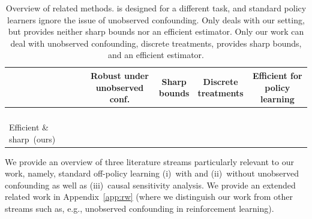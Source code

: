 \documentclass{article} %
\theoremstyle{plain}
\theoremstyle{definition}
\theoremstyle{remark}
\newcommand{\cmark}{\textcolor{ForestGreen}{\ding{51}}}
\newcommand{\xmark}{\textcolor{BrickRed}{\ding{55}}}
\begin{document}
\begin{table} %
\vspace{-1.7cm}              %
\setlength{\intextsep}{0pt}          %
\setlength{\columnsep}{1em}          %
\centering
\begin{adjustbox}{width=\linewidth}
    \tiny
    \begin{tabular}{lcccc}
    \toprule
    \multicolumn{1}{c}{} & \makecell{Robust under\\unobserved conf.} &
    \makecell{Sharp\\bounds} &
    \makecell{Discrete\\treatments} &
    \makecell{Efficient for\\policy learning} \\
    \midrule
    \citet{Oprescu.2023} &  \textbf{\cmark} & \textbf{\cmark} & \textbf{\xmark} & \textbf{\xmark} \\
    \citet{Swaminathan.2015} &  \textbf{\xmark} & \textbf{\xmark} & \textbf{\cmark}& \textbf{\xmark} \\
    \citet{Athey.2021, Dudik.2011} &  \textbf{\xmark} & \textbf{\xmark} & \textbf{\cmark}& \textbf{\cmark} \\
    \citet{Kallus.2018c,Kallus.2021d} &  \textbf{\cmark} & \textbf{\xmark} & \textbf{\cmark} & \textbf{\xmark} \\
    \midrule
    Efficient \& sharp~(ours) & \textbf{\cmark} & \textbf{\cmark} & \textbf{\cmark} & \textbf{\cmark} \\
    \bottomrule
    \end{tabular}
\end{adjustbox}
\vspace{-0.3cm} 
\caption{Overview of related methods. \citet{Oprescu.2023} is designed for a different task, and standard policy learners ignore the issue of unobserved confounding. Only \citet{Kallus.2018c,Kallus.2021d} deals with  our setting, but provides neither sharp bounds nor an efficient estimator. Only our work can deal with unobserved confounding, discrete treatments, provides sharp bounds, and an efficient estimator.}\label{tab:table_method_overview}
\vspace{-0.7cm} 
\end{table}

We provide an overview of three literature streams particularly relevant to our work, namely, standard off-policy learning (i)~with and (ii)~without unobserved confounding as well as (iii)~causal sensitivity analysis. We provide an extended related work in Appendix~\ref{app:rw} (where we distinguish our work from other streams such as, e.g., unobserved confounding in reinforcement learning).
\end{document}
